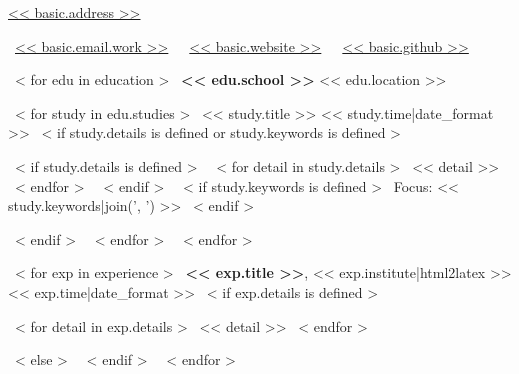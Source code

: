 \documentclass[letterpaper,MMMyyyy,nonstopmode]{simpleresumecv}
\newcommand{\CVAuthor}{<< basic.name >>}
\newcommand{\CVWebpage}{<< basic.website >>}
\let\OldSection\Section
\renewcommand{\Section}[3]{\color{mycolor}\OldSection{#1}{#2}{#3}\color{black}}
\let\OldBulletItem\BulletItem
\renewcommand{\BulletItem}{{\color{mycolor}\OldBulletItem}}
\let\OldSubBulletItem\SubBulletItem
\renewcommand{\SubBulletItem}{{\color{mycolor}\OldSubBulletItem}}
\begin{document}

{\color{mycolor}
\Title{\CVAuthor}
}

\begin{SubTitle}
\href{https://www.google.com/maps/place/<< basic.address|urlencode >>}
{<< basic.address >>}
\par
{\color{mycolor}\faEnvelopeO}\,
\href{mailto:<< basic.email.work >>}
{<< basic.email.work >>}
\,\SubBulletSymbol\,
{\color{mycolor}\faGlobe}\,
\href{\CVWebpage}
{\url{\CVWebpage}}
\,\SubBulletSymbol\,
{\color{mycolor}\faGithub}\,
\href{https://github.com/<< basic.github >>}{<< basic.github >>}
\end{SubTitle}

\begin{Body}



~< for edu in education >~
    \Entry
    \textbf{<< edu.school >>}
    \hfill
    << edu.location >>

    \Gap
    ~< for study in edu.studies >~
        \BulletItem
        << study.title >>
        \hfill
        << study.time|date_format >>
        ~< if study.details is defined or study.keywords is defined >~
            \begin{Detail}
                ~< if study.details is defined >~
                    ~< for detail in study.details >~
                        \SubBulletItem
                        << detail >>
                    ~< endfor >~
                ~< endif >~
                ~< if study.keywords is defined >~
                    \SubBulletItem
                    Focus:
                    << study.keywords|join(', ') >>
                ~< endif >~
            \end{Detail}
        ~< endif >~
    ~< endfor >~
~< endfor >~



~< for exp in experience >~
    \Entry
    \textbf{<< exp.title >>},
    << exp.institute|html2latex >>
    \hfill
    << exp.time|date_format >>
    ~< if exp.details is defined >~
        \begin{Detail}
        ~< for detail in exp.details >~
            \BulletItem
            << detail >>
        ~< endfor >~
        \end{Detail}
    ~< else >~
        \Gap
    ~< endif >~
~< endfor >~


\end{Body}
\end{document}
